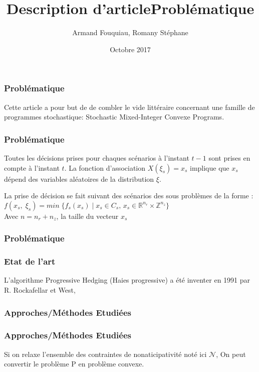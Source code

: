 \documentclass[10pt]{beamer}
\title{Description d'article}
\author{Armand Fouquiau, Romany Stéphane}
\institute{Université Paris-Sud}
\date{Octobre 2017}
\newcommand{\reels}{\mathbb{R}}
\newcommand{\integers}{\mathbb{Z}}
\begin{document}
    \begin{frame}
    \titlepage
    \end{frame}

    
        \begin{frame}
        \frametitle{Problématique}
        Cette article a pour but de de combler le vide littéraire concernant une famille de programmes stochastique: Stochastic Mixed-Integer Convexe Programs.
    \end{frame}
        
    \begin{frame}
        \frametitle{Problématique}
        Toutes les décisions prises pour chaques scénarios à l'instant $t-1$ sont prises en compte à l'instant $t$. La fonction d'association $X(\xi_s) = x_s$ implique que $x_s$ dépend des variables aléatoires de la distribution $\xi$.
    \end{frame}
    
    
    \begin{frame}
        \title{Problématique}
        La prise de décision se fait suivant des scénarios des sous problèmes de la forme : 
         $f(x_s, \;\xi_{s}) = min \;\{f_s(x_s) \; | \; x_s \in C_s, \,x_s \in \reels^{n_r} \times \integers^{n_z}\}$\\
         Avec $n = n_r + n_z$, la taille du vecteur $x_s$
    \end{frame}
    
    
    \begin{frame}
        \frametitle{Problématique}
                
    \end{frame}
        
    \begin{frame}
        \frametitle{Etat de l'art}
        L'algorithme Progressive Hedging (Haies progressive) a été inventer en 1991 par R. Rockafellar et West, 
    \end{frame}
        
    \begin{frame}
        \frametitle{Approches/Méthodes Etudiées}
    \end{frame}
    
    \begin{frame}
        \frametitle{Approches/Méthodes Etudiées}
        Si on relaxe l'ensemble des contraintes de nonaticipativité noté ici $\mathcal{N}$, On peut convertir le problème P en problème convexe.
    \end{frame}
    
\end{document}
